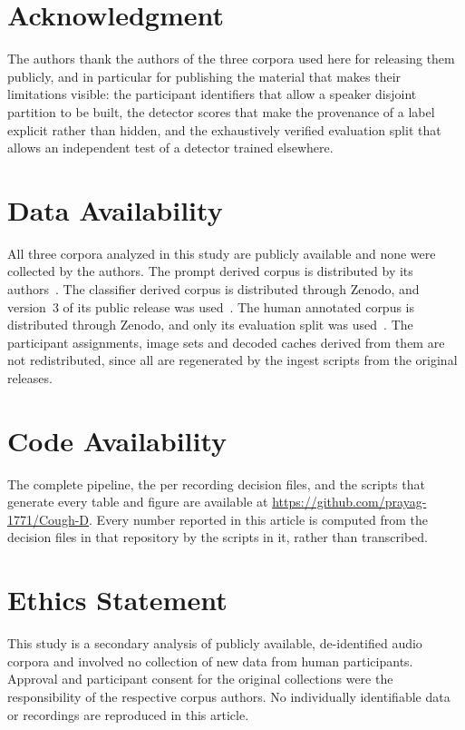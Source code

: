 \documentclass{ieeeaccess}
\begin{document}
\section*{Acknowledgment}

The authors thank the authors of the three corpora used here for releasing them publicly,
and in particular for publishing the material that makes their limitations visible: the
participant identifiers that allow a speaker disjoint partition to be built, the detector
scores that make the provenance of a label explicit rather than hidden, and the
exhaustively verified evaluation split that allows an independent test of a detector
trained elsewhere.

\section*{Data Availability}

All three corpora analyzed in this study are publicly available and none were collected by
the authors. The prompt derived corpus is distributed by its authors~\cite{coswara2020}.
The classifier derived corpus is distributed through Zenodo, and version~3 of its public
release was used~\cite{coughvid2021}. The human annotated corpus is distributed through
Zenodo, and only its evaluation split was used~\cite{fsd50k2022}. The participant
assignments, image sets and decoded caches derived from them are not redistributed, since
all are regenerated by the ingest scripts from the original releases.

\section*{Code Availability}

The complete pipeline, the per recording decision files, and the scripts that generate
every table and figure are available at
\url{https://github.com/prayag-1771/Cough-D}. Every number reported in this article is
computed from the decision files in that repository by the scripts in it, rather than
transcribed.

\section*{Ethics Statement}

This study is a secondary analysis of publicly available, de-identified audio corpora and
involved no collection of new data from human participants. Approval and participant
consent for the original collections were the responsibility of the respective corpus
authors. No individually identifiable data or recordings are reproduced in this article.
\end{document}
